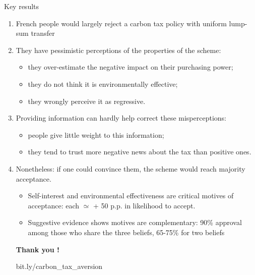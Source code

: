 \documentclass[aspectratio=169,9pt,dvipsnames]{beamer}
\begin{document}
    \begin{frame}{Key results}

\begin{enumerate}%
    \item French people would largely reject a carbon tax policy with uniform lump-sum transfer
    
    \medskip
    \pause
    \item They have pessimistic perceptions of the properties of the scheme:
        \begin{itemize}
            \item they over-estimate the negative impact on their purchasing power;
            \item they do not think it is environmentally effective;
            \item they wrongly perceive it as regressive.
        \end{itemize}

    \medskip
    \pause
    \item Providing information can hardly help correct these misperceptions:
        \begin{itemize}
            \item people give little weight to this information;
            \item they tend to trust more negative news about the tax than positive ones.
        \end{itemize}

    \medskip
    \pause
    \item Nonetheless: if one could convince them, the scheme would reach majority acceptance.
        \begin{itemize}
            \item Self-interest and environmental effectiveness are critical motives of acceptance: each $\simeq$ + 50 p.p. in likelihood to accept.
            \item Suggestive evidence shows motives are complementary: 90\% approval among those who share the three beliefs, 65-75\% for two beliefs
        \end{itemize}
    \pause
    \medskip
    
    \center \textbf{Thank you !}
    \medskip
    
    bit.ly/carbon\_tax\_aversion
\end{enumerate}

    \end{frame}

    
\end{document}

